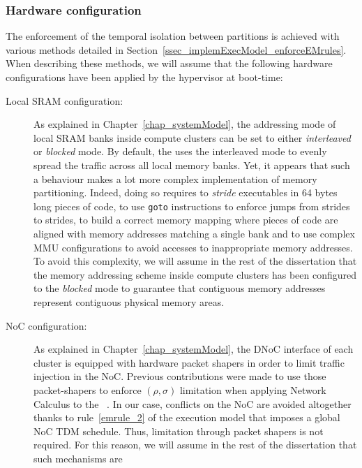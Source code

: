 \documentclass[main.tex]{subfiles}
\begin{document}
\subsubsection{Hardware configuration}
\label{sssec_implemExecModel_assumptions_HwConfig} The enforcement of the
temporal isolation between partitions is achieved with various methods detailed
in Section~\ref{ssec_implemExecModel_enforceEMrules}. When describing these
methods, we will assume that the following hardware configurations have been
applied by the hypervisor at boot-time:
\begin{description}
    \item[Local SRAM configuration: ] As explained in
        Chapter~\ref{chap_systemModel}, the addressing mode of local SRAM banks
        inside compute clusters can be set to either \emph{interleaved} or
        \emph{blocked} mode. By default, the \mppalong uses the interleaved
        mode to evenly spread the traffic across all local memory banks. Yet,
        it appears that such a behaviour makes a lot more complex
        implementation of memory partitioning. Indeed, doing so requires to
        \emph{stride} executables in 64 bytes long pieces of code, to use
        \verb#goto# instructions to enforce jumps from strides to strides, to
        build a correct memory mapping where pieces of code are aligned with
        memory addresses matching a single bank and to use complex MMU
        configurations to avoid accesses to inappropriate memory addresses. To
        avoid this complexity, we will assume in the rest of the dissertation
        that the memory addressing scheme inside compute clusters has been
        configured to the \emph{blocked} mode to guarantee that contiguous
        memory addresses represent contiguous physical memory areas.
    \item[NoC configuration: ] As explained in Chapter~\ref{chap_systemModel},
        the DNoC interface of each cluster is equipped with hardware packet
        shapers in order to limit traffic injection in the NoC. Previous
        contributions were made to use those packet-shapers to enforce $(\rho,
        \sigma)$ limitation when applying Network Calculus to the
        \mppalong~\cite{Dinechin2014,Giannopoulou2015}. In our case, conflicts
        on the NoC are avoided altogether thanks to rule~\ref{emrule_2} of the
        execution model that imposes a global NoC TDM schedule. Thus,
        limitation through packet shapers is not required. For this reason, we
        will assume in the rest of the dissertation that such mechanisms are

\end{description}
\end{document}

